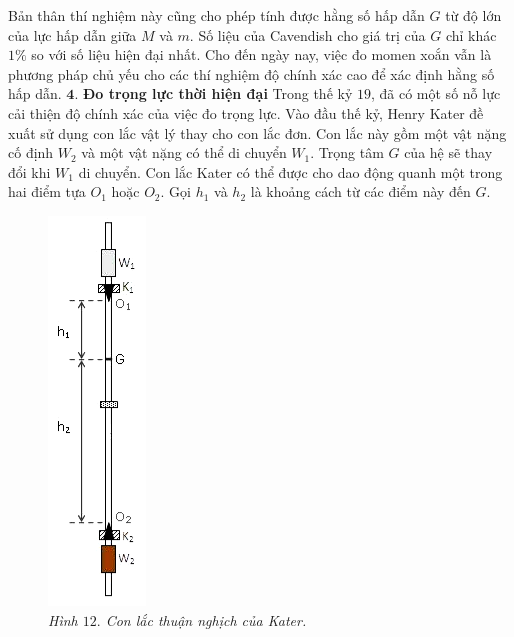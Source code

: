 \begin{multicols}{2}
	\vskip 0.1cm
	Bản thân thí nghiệm này cũng cho phép tính được hằng số hấp dẫn $G$ từ độ lớn của lực hấp dẫn giữa $M$ và $m$. Số liệu của Cavendish cho giá trị của $G$ chỉ khác $1\%$ so với số liệu hiện đại nhất. Cho đến ngày nay, việc đo momen xoắn vẫn là phương pháp chủ yếu cho các thí nghiệm độ chính xác cao để xác định hằng số hấp dẫn.
	\vskip 0.1cm
	$\pmb{4.}$ \textbf{\color{timhieukhoahoc}Đo trọng lực thời hiện đại}
	\vskip 0.1cm
	Trong thế kỷ $19$, đã có một số nỗ lực cải thiện độ chính xác của việc đo trọng lực. Vào đầu thế kỷ, Henry Kater đề xuất sử dụng con lắc vật lý thay cho con lắc đơn. Con lắc này gồm một vật nặng cố định $W_2$ và một vật nặng có thể di chuyển $W_1$. Trọng tâm $G$ của hệ sẽ thay đổi khi $W_1$ di chuyển. Con lắc Kater có thể được cho dao động quanh một trong hai điểm tựa $O_1$ hoặc $O_2$. Gọi $h_1$ và $h_2$ là khoảng cách từ các điểm này đến $G$.
	\begin{figure}[H]
		\vspace*{-5pt}
		\centering
		\captionsetup{labelformat= empty, justification=centering}
		\includegraphics[width =0.3\linewidth]{14}
		\caption{\small\textit{\color{timhieukhoahoc}Hình $12.$ Con lắc thuận nghịch của Kater.}}

\end{figure}
\end{multicols}

